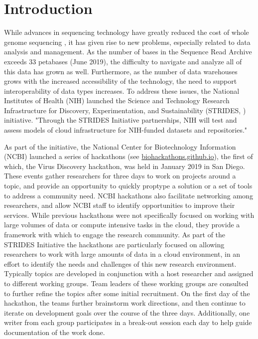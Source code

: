 \section{Introduction}

While advances in sequencing technology have greatly reduced the cost of whole
genome sequencing \cite{Mardis2011}, it has given rise to new problems,
especially related to data analysis and management. As the number of bases in
the Sequence Read Archive \cite{Kodama2012} exceeds 33 petabases (June 2019),
the difficulty to navigate and analyze all of this data has grown as well.
Furthermore, as the number of data warehouses grows with the increased
accessibility of the technology, the need to support interoperability of data
types increases. To address these issues, the National Institutes of Health
(NIH) launched the Science and Technology Research Infrastructure for
Discovery, Experimentation, and Sustainability (STRIDES, \cite{StridesWeb})
initiative. "Through the STRIDES Initiative partnerships, NIH will test and
assess models of cloud infrastructure for NIH-funded datasets and
repositories."

As part of the initiative, the National Center for Biotechnology Information
(NCBI) \cite{Sayers2019} launched a series of hackathons (see \url{biohackathons.github.io}), the
first of which, the Virus Discovery hackathon, was held in January 2019 in San
Diego. These events gather researchers for three days to work on projects
around a topic, and provide an opportunity to quickly proptype a solution or a
set of tools to address a community need. NCBI hackathons also facilitate
networking among researchers, and allow NCBI staff to identify opportunities to
improve their services. While previous hackathons were not specifically focused
on working with large volumes of data or compute intensive tasks in the cloud,
they provide a framework with which to engage the research community. As part
of the STRIDES Initiative the hackathons are particularly focused on allowing
researchers to work with large amounts of data in a cloud environment, in an
effort to identify the needs and challenges of this new research environment.
Typically topics are developed in conjunction with a host researcher and
assigned to different working groups. Team leaders of these working groups are
consulted to further refine the topics after some initial recruitment. On the
first day of the hackathon, the teams further brainstorm work directions, and
then continue to iterate on development goals over the course of the three
days. Additionally, one writer from each group participates in a break-out
session each day to help guide documentation of the work done.

